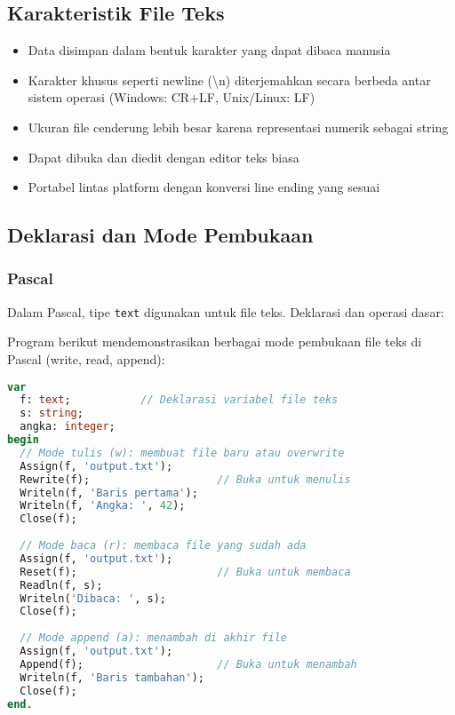 \documentclass[../main.tex]{subfiles}
\begin{document}
\subsection{Karakteristik File Teks}
\begin{itemize}
  \item Data disimpan dalam bentuk karakter yang dapat dibaca manusia
  \item Karakter khusus seperti newline (\textbackslash n) diterjemahkan secara berbeda antar sistem operasi (Windows: CR+LF, Unix/Linux: LF)
  \item Ukuran file cenderung lebih besar karena representasi numerik sebagai string
  \item Dapat dibuka dan diedit dengan editor teks biasa
  \item Portabel lintas platform dengan konversi line ending yang sesuai
\end{itemize}

\subsection{Deklarasi dan Mode Pembukaan}

\subsubsection{Pascal}
Dalam Pascal, tipe \texttt{text} digunakan untuk file teks. Deklarasi dan operasi dasar:

Program berikut mendemonstrasikan berbagai mode pembukaan file teks di Pascal (write, read, append):

\begin{lstlisting}[language=Pascal, caption={Deklarasi dan mode file teks Pascal}]
var
  f: text;           // Deklarasi variabel file teks
  s: string;
  angka: integer;
begin
  // Mode tulis (w): membuat file baru atau overwrite
  Assign(f, 'output.txt');
  Rewrite(f);                    // Buka untuk menulis
  Writeln(f, 'Baris pertama');
  Writeln(f, 'Angka: ', 42);
  Close(f);
  
  // Mode baca (r): membaca file yang sudah ada
  Assign(f, 'output.txt');
  Reset(f);                      // Buka untuk membaca
  Readln(f, s);
  Writeln('Dibaca: ', s);
  Close(f);
  
  // Mode append (a): menambah di akhir file
  Assign(f, 'output.txt');
  Append(f);                     // Buka untuk menambah
  Writeln(f, 'Baris tambahan');
  Close(f);
end.
\end{lstlisting}
\end{document}
